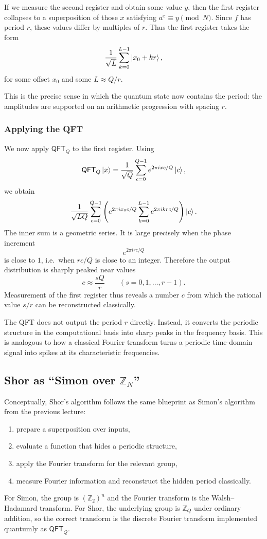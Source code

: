If we measure the second register and obtain some value $y$, then the first register collapses to a superposition of those $x$ satisfying $a^x \equiv y \pmod N$. Since $f$ has period $r$, these values differ by multiples of $r$. Thus the first register takes the form
\[
    \frac{1}{\sqrt{L}} \sum_{k=0}^{L-1} \ket{x_0 + kr},
\]
for some offset $x_0$ and some $L \approx Q/r$.

This is the precise sense in which the quantum state now contains the period: the amplitudes are supported on an arithmetic progression with spacing $r$.

\subsubsection{Applying the QFT}

We now apply $\mathsf{QFT}_Q$ to the first register. Using
\[
    \mathsf{QFT}_Q \ket{x}
    =
    \frac{1}{\sqrt{Q}} \sum_{c=0}^{Q-1} e^{2\pi ixc/Q}\ket{c},
\]
we obtain
\[
    \frac{1}{\sqrt{LQ}} \sum_{c=0}^{Q-1}
    \left(
        e^{2\pi i x_0 c/Q}
        \sum_{k=0}^{L-1} e^{2\pi i krc/Q}
    \right)\ket{c}.
\]
The inner sum is a geometric series. It is large precisely when the phase increment
\[
    e^{2\pi i rc/Q}
\]
is close to $1$, i.e.\ when $rc/Q$ is close to an integer. Therefore the output distribution is sharply peaked near values
\[
    c \approx \frac{sQ}{r}
    \qquad
    (s = 0,1,\dots,r-1).
\]
Measurement of the first register thus reveals a number $c$ from which the rational value $s/r$ can be reconstructed classically.

\begin{remark}
The QFT does not output the period $r$ directly. Instead, it converts the periodic structure in the computational basis into sharp peaks in the frequency basis. This is analogous to how a classical Fourier transform turns a periodic time-domain signal into spikes at its characteristic frequencies.
\end{remark}

\subsection{Shor as ``Simon over \texorpdfstring{$\mathbb{Z}_N$}{Z\_N}''}

Conceptually, Shor's algorithm follows the same blueprint as Simon's algorithm from the previous lecture:
\begin{enumerate}
    \item prepare a superposition over inputs,
    \item evaluate a function that hides a periodic structure,
    \item apply the Fourier transform for the relevant group,
    \item measure Fourier information and reconstruct the hidden period classically.
\end{enumerate}
For Simon, the group is $(\mathbb{Z}_2)^n$ and the Fourier transform is the Walsh--Hadamard transform. For Shor, the underlying group is $\mathbb{Z}_Q$ under ordinary addition, so the correct transform is the discrete Fourier transform implemented quantumly as $\mathsf{QFT}_Q$.

